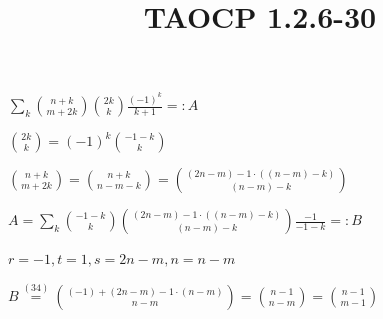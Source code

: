 \documentclass{article}
\title{TAOCP 1.2.6\mbox{-}30}
\begin{document}
\maketitle

\( \sum_{k} \binom{n+k}{m+2k}\binom{2k}{k}\frac{{(-1)}^{k}}{k+1} =: A \)

\( \binom{2k}{k} = {(-1)}^{k}\binom{-1-k}{k} \)

\( \binom{n+k}{m+2k} = \binom{n+k}{n-m-k} = \binom{(2n-m) - 1\cdot((n-m)-k)}{(n-m)-k} \)

\( A = \sum_{k} \binom{-1-k}{k}\binom{(2n-m) - 1\cdot((n-m)-k)}{(n-m)-k}\frac{-1}{-1-k} =: B \)

\( r = -1, t = 1, s = 2n-m, n = n-m \)

\( B \overset{(34)}{=} \binom{(-1)+(2n-m)-1\cdot(n-m)}{n-m} = \binom{n - 1}{n-m} = \binom{n-1}{m-1} \)
\end{document}
